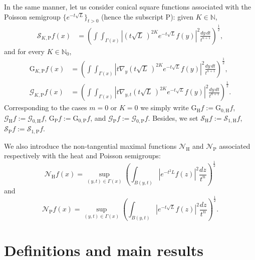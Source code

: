 \documentclass[11pt, a4paper,leqno]{amsart}
\theoremstyle{plain}
\theoremstyle{definition}
\theoremstyle{remark}
\numberwithin{equation}{section}
\def \Scal{ \mathcal{S} }
\def \hh{ \mathrm{H} }
\def \pp{ \mathrm{P} }
\def \Ncal { \mathcal{N} }
\def \iint{\int\!\!\!\int}
\begin{document}
In the same manner, let us consider conical square functions associated with the Poisson semigroup $\{e^{-t \sqrt{L}}\}_{t>0}$ (hence the subscript $\pp$):  given $K\in \mathbb{N}$,
\begin{align}
\mathcal{S}_{K,\pp}f(x)
&=
\left(\iint_{\Gamma(x)}|(t\sqrt{L}\,)^{2K} e^{-t\sqrt{L}}f(y)|^2 \frac{dy \, dt}{t^{n+1}}\right)^{\frac{1}{2}},
\label{square-P-1}
\end{align}
and for every $K\in \mathbb{N}_0$,
\begin{align}
\mathrm{G}_{K,\pp}f(x)
&=\left(\iint_{\Gamma(x)}|t\nabla_y (t\sqrt{L}\,)^{2K} e^{-t\sqrt{L}}f(y)|^2 \frac{dy \, dt}{t^{n+1}}\right)^{\frac{1}{2}},
\label{square-P-2}
\\[4pt]
\mathcal{G}_{K,\pp}f(x)
&=
\left(\iint_{\Gamma(x)}|t\nabla_{y,t}(t\sqrt{L}\,)^{2K} e^{-t\sqrt{L}}f(y)|^2 \frac{dy \, dt}{t^{n+1}}\right)^{\frac{1}{2}}.
\label{square-P-3}
\end{align}
Corresponding to the cases $m=0$ or $K=0$ we simply write $\mathrm{G}_{\hh}f:=\mathrm{G}_{0,\hh}f$,
$\mathcal{G}_{\hh}f:=\mathcal{G}_{0,\hh}f$,  $\mathrm{G}_{\pp}f:=\mathrm{G}_{0,\pp}f$, and
$\mathcal{G}_{\pp}f:=\mathcal{G}_{0,\pp}f$. Besides, we set $\Scal_{\hh}f:=\Scal_{1,\hh}f$, $\Scal_{\pp}f:=\Scal_{1,\pp}f$.


We also introduce the non-tangential maximal functions $\Ncal_{\hh}$ and $\Ncal_{\pp}$ associated respectively with the heat and Poisson semigroups:
\begin{equation}\label{nontangential1}
\mathcal{N}_{\hh}f(x)=\sup_{(y,t)\in \Gamma(x)}\left(\int_{B(y,t)}
|e^{-t^2L}f(z)|^2 \frac{dz}{t^n}\right)^{\frac{1}{2}}
\end{equation}
and
\begin{equation}\label{nontangential2}
 \mathcal{N}_{\pp}f(x)=\sup_{(y,t)\in \Gamma(x)}\left(\int_{B(y,t)}
|e^{-t\sqrt{L}}f(z)|^2 \frac{dz}{t^n}\right)^{\frac{1}{2}}.
\end{equation}



\section{Definitions and main results}\label{section-main}



\end{document}
